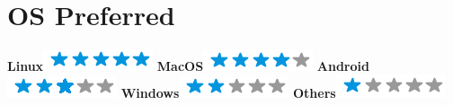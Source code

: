 \begin{aside}
    ~
    ~
    ~
    ~
    ~
    ~
    ~
    ~
    ~
    ~
    ~
    ~
    ~
    ~
    ~
    ~
    ~
    ~
    ~
    ~
    ~
    ~
    ~
    ~
    ~
    ~
    ~
    ~
    \section{OS Preferred}
    \textbf{Linux}\includegraphics[scale=0.40]{img/5stars.png}
    \textbf{MacOS}\includegraphics[scale=0.40]{img/4stars.png}
    \textbf{Android}\includegraphics[scale=0.40]{img/3stars.png}
    \textbf{Windows}\includegraphics[scale=0.40]{img/2stars.png}
    \textbf{Others}\includegraphics[scale=0.40]{img/1stars.png}
\end{aside}

